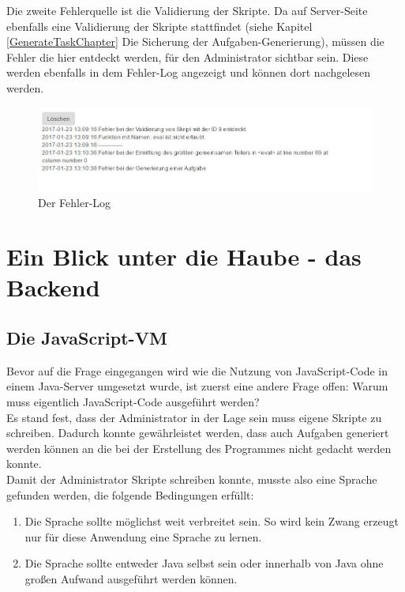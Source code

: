Die zweite Fehlerquelle ist die Validierung der Skripte. Da auf Server-Seite ebenfalls eine Validierung der Skripte stattfindet (siehe Kapitel \ref{GenerateTaskChapter} Die Sicherung der Aufgaben-Generierung), müssen die Fehler die hier entdeckt werden, für den Administrator sichtbar sein. Diese werden ebenfalls in dem Fehler-Log angezeigt und können dort nachgelesen werden.

\begin{figure}[htp]     %
\centering
\includegraphics[width=1\textwidth]{bilder/ErrorLog} 
\caption[Der Fehler-Log]{Der Fehler-Log}
\end{figure} 


\chapter{Ein Blick unter die Haube - das Backend}


\section{Die JavaScript-VM}

Bevor auf die Frage eingegangen wird wie die Nutzung von JavaScript-Code in einem Java-Server umgesetzt wurde, ist zuerst eine andere Frage offen: Warum muss eigentlich JavaScript-Code ausgeführt werden? \\

Es stand fest, dass der Administrator in der Lage sein muss eigene Skripte zu schreiben. Dadurch konnte gewährleistet werden, dass auch Aufgaben generiert werden können an die bei der Erstellung des Programmes nicht gedacht werden konnte. \\
Damit der Administrator Skripte schreiben konnte, musste also eine Sprache gefunden werden, die folgende Bedingungen erfüllt:
\begin{enumerate}
\itemsep0em
\item Die Sprache sollte möglichst weit verbreitet sein. So wird kein Zwang erzeugt nur für diese Anwendung eine Sprache zu lernen.
\item Die Sprache sollte entweder Java selbst sein oder innerhalb von Java ohne großen Aufwand ausgeführt werden können.
\end{enumerate}

